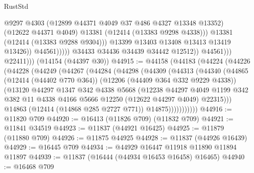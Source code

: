 \begin{lexlean}{RustStd}
\begin{coremodule}
                                      @9297
                                      @4303
                                      (@12899 @44371 @4049 @37 @486 @4327 @13348 @13352)
                                      (@12622 @44371 @4049)
                                      @13381
                                      (@12414 (@13383 @9298 @4338)))
                                    @13381
                                    (@12414 (@13383 @9288 @9304)))
                                  @13399
                                  @13403
                                  @13408
                                  @13413
                                  @13419
                                  @13426))
                              @44561)))))
                    @34433
                    @34436
                    @34439
                    @34442
                    @12512))
                @44561)))
          @22411)))
    (@14154 (@44397 @30))
@44915 := @44158
    (@44183
      (@44224
        (@44226
          (@44228
            (@44249
              (@44267
                (@44284
                  (@44298
                    (@44309
                      (@44313
                        (@44340
                          (@44865
                            (@12414 (@44402 @770 @364))
                            (@12206 (@44409 @364 @332 @9229 @4338))
                            (@13120
                              @44297
                              @1347
                              @342
                              @4338
                              @5668
                              (@12238
                                @44297
                                @4049
                                @1199
                                @342
                                @382
                                @11
                                @4338
                                @4166
                                @5666
                                @12250
                                (@12622 @44297 @4049)
                                @22315)))
                          @14863
                          (@12414 (@14868 @285 @2727 @771))
                          @14875)))))))))))
@44916 := @11820 @709
@44920 := @16413 (@11826 @709) (@11832 @709)
@44921 := @11841 @34519
@44923 := @11837 (@44921 @16425)
@44925 := @11879 (@11880 @709)
@44926 := @11875 @44925
@44928 := @11837 (@44926 @16439)
@44929 := @16445 @709
@44934 := @44929 @16447 @11918 @11890 @11894 @11897
@44939 := @11837 (@16444 (@44934 @16453 @16458) @16465)
@44940 := @16468 @709

\end{coremodule}
\end{lexlean}
